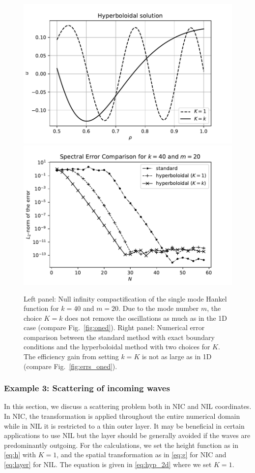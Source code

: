 \documentclass[final,onefignum,onetabnum]{siamart190516}
\begin{document}
\begin{figure}[tbhp]
	\centering
	\includegraphics[scale=0.4]{figs/hyp_twod}
	\includegraphics[scale=0.4]{figs/sp_err_2d}
	\caption{Left panel: Null infinity compactification of the single mode Hankel function for $k=40$ and $m=20$. Due to the mode number $m$, the choice $K=k$ does not remove the oscillations as much as in the 1D case (compare Fig.~\ref{fig:oned}). Right panel: Numerical error comparison between the standard method with exact boundary conditions and the hyperboloidal method with two choices for $K$. The efficiency gain from setting $k=K$ is not as large as in 1D (compare Fig.~\ref{fig:errs_oned}). }
	\label{fig:twod}
\end{figure}



\subsubsection{Example 3: Scattering of incoming waves}
In this section, we discuss a scattering problem both in NIC and NIL coordinates. In NIC, the transformation is applied throughout the entire numerical domain while in NIL it is restricted to a thin outer layer.  It may be beneficial in certain applications to use NIL but the layer should be generally avoided if the waves are predominantly outgoing. For the calculations, we set the height function as in \eqref{eq:h} with $K=1$,  and the spatial transformation as in \eqref{eq:g} for NIC and \eqref{eq:layer} for NIL. The equation is given in \eqref{eq:hyp_2d} where we set $K=1$.
\end{document}
